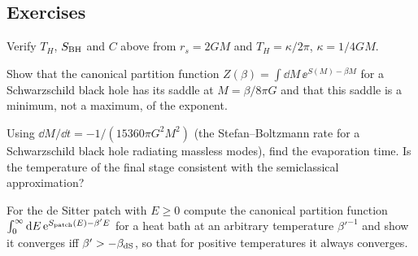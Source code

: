 \subsection*{Exercises}
\begin{exercise}\label{ex:bhdS:1}
Verify $T_H$, $S_{\rm BH}$ and $C$ above from $r_s=2GM$ and $T_H=\kappa/2\pi$, $\kappa=1/4GM$.
\end{exercise}
\begin{exercise}\label{ex:bhdS:2}
Show that the canonical partition function $Z(\beta)=\int\dd M\,\ee^{S(M)-\beta M}$ for a Schwarzschild black hole has its saddle at $M=\beta/8\pi G$ and that this saddle is a minimum, not a maximum, of the exponent.
\end{exercise}
\begin{exercise}\label{ex:bhdS:3}
Using $\dd M/\dd t=-1/(15360\pi G^2M^2)$ (the Stefan--Boltzmann rate for a Schwarzschild black hole radiating massless modes), find the evaporation time. Is the temperature of the final stage consistent with the semiclassical approximation?
\end{exercise}
\begin{exercise}\label{ex:bhdS:4}
For the de Sitter patch with $E\ge0$ compute the canonical partition function $\int_0^\infty\mathrm{d} E\,\mathrm{e}^{S_{\rm patch}(E)-\beta'E}$ for a heat bath at an arbitrary temperature $\beta'^{-1}$ and show it converges iff $\beta'>-\beta_{\rm dS}$, so that for positive temperatures it always converges.
\end{exercise}
